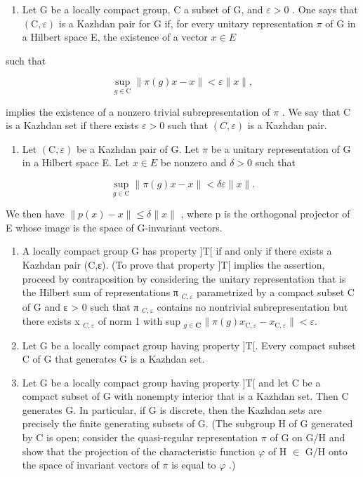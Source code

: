\begin{enumerate}
\def\labelenumi{\arabic{enumi})}
\setcounter{enumi}{14}
\tightlist
\item
  Let G be a locally compact group, C a subset of G, and \(\varepsilon > 0\) . One says that \((\mathrm{C}, \varepsilon)\) is a Kazhdan pair for G if, for every unitary representation \(\pi\) of G in a Hilbert space E, the existence of a vector \(x \in E\)
\end{enumerate}

such that

\[
\sup _ {g \in \mathrm{C}} \| \pi (g) x - x \| <   \varepsilon \| x \|,
\]

  implies the existence of a nonzero trivial subrepresentation of \(\pi\) . We say that C is a Kazhdan set if there exists \(\varepsilon > 0\) such that \((C, \varepsilon)\) is a Kazhdan pair.

\begin{enumerate}
\def\labelenumi{\alph{enumi})}
\tightlist
\item
  Let \((\mathrm{C}, \varepsilon)\) be a Kazhdan pair of G. Let \(\pi\) be a unitary representation of G in a Hilbert space E. Let \(x \in E\) be nonzero and \(\delta > 0\) such that
\end{enumerate}

\[
\sup _ {g \in \mathrm{C}} \| \pi (g) x - x \| <   \delta \varepsilon \| x \|.
\]

We then have \(\|p(x)-x\|\leqslant\delta\|x\|\) , where p is the orthogonal projector of E whose image is the space of G-invariant vectors.

\begin{enumerate}
\def\labelenumi{\alph{enumi})}
\setcounter{enumi}{1}
\item
  A locally compact group G has property ]T[ if and only if there exists a Kazhdan pair (C,ε). (To prove that property ]T[ implies the assertion, proceed by contraposition by considering the unitary representation that is the Hilbert sum of representations π \(_{C,\varepsilon}\) parametrized by a compact subset C of G and ε > 0 such that π \(_{C,\varepsilon}\) contains no nontrivial subrepresentation but there exists x \(_{C,\varepsilon}\) of norm 1 with sup \(_{g\in\mathbf{C}}\|\pi(g)x_{\mathrm{C},\varepsilon}-x_{\mathrm{C},\varepsilon}\|<\varepsilon.\)
\item
  Let G be a locally compact group having property ]T[. Every compact subset C of G that generates G is a Kazhdan set.
\item
  Let G be a locally compact group having property ]T[ and let C be a compact subset of G with nonempty interior that is a Kazhdan set. Then C generates G. In particular, if G is discrete, then the Kazhdan sets are precisely the finite generating subsets of G. (The subgroup H of G generated by C is open; consider the quasi-regular representation \(\pi\) of G on G/H and show that the projection of the characteristic function \(\varphi\) of H \(\in\) G/H onto the space of invariant vectors of \(\pi\) is equal to \(\varphi\) .)
\end{enumerate}

